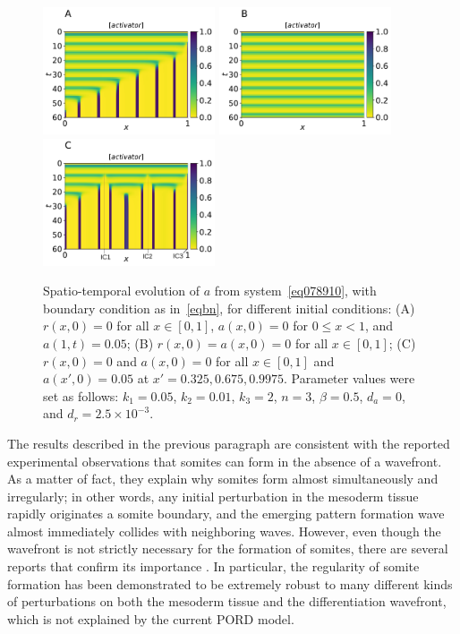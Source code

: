 \documentclass[11pt]{article}
\begin{document}
	\begin{figure}[t!]
		\centering
		\includegraphics[width=2in]{Figures/Fig02aRev.pdf}
		\includegraphics[width=2in]{Figures/Fig02bRev.pdf}
		\includegraphics[width=2in]{Figures/Fig02cRev.pdf}
		\caption{Spatio-temporal evolution of $a$ from system~\eqref{eq078910}, with
			boundary condition as in~\eqref{eqbn}, for different initial conditions: (A)
			$r(x, 0)=0$ for all $x\in[0,1]$, $a(x, 0)=0$ for $0\leq x<1$, and $a(1, t) =
			0.05$; (B) $r(x, 0) = a(x, 0)=0$ for all $x\in[0,1]$; (C) $r(x, 0)=0$ and $a(x,
			0)=0$ for all $x\in[0,1]$ and $a(x',0)=0.05$ at $x'=0.325, 0.675, 0.9975$.
			Parameter values were set as follows: $k_1=0.05$, $k_2=0.01$, $k_3=2$, $n=3$,
			$\beta=0.5$, $d_a=0$, and $d_r=2.5\times10^{-3}$.}
		\label{Fig02}
	\end{figure}
	
	The results described in the previous paragraph are consistent with the reported
	experimental observations that somites can form in the absence of a wavefront.
	As a matter of fact, they explain why somites form almost simultaneously and
	irregularly; in other words, any initial perturbation in the mesoderm tissue
	rapidly originates a somite boundary, and the emerging pattern formation wave
	almost immediately collides with neighboring waves. However, even though the
	wavefront is not strictly necessary for the formation of somites, there are
	several reports that confirm its importance
	\citep{Sawada2001, Naiche2011} . In particular, the regularity of somite
	formation has been demonstrated to be extremely robust to many different kinds
	of perturbations on both the mesoderm tissue and the differentiation wavefront,
	which is not explained by the current PORD model. 
	
\end{document}
